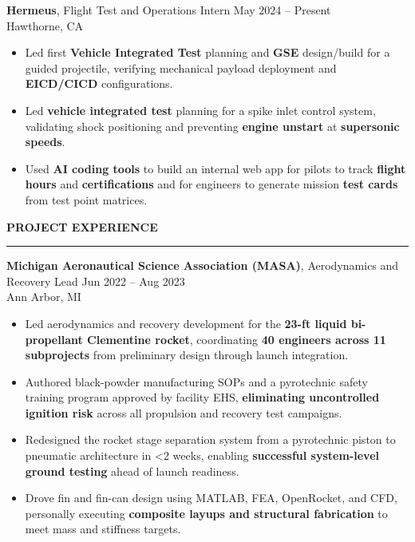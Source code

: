 \documentclass[10pt]{article}
\newcommand{\ressection}[1]{
  \vspace{0.12em}
  {\large\bfseries #1}\par
  \vspace{0.05em}\hrule\vspace{0.12em}
}
\begin{document}
{\bfseries Hermeus}, Flight Test and Operations Intern \hfill May 2024 -- Present \\
Hawthorne, CA
\begin{itemize}
\item Led first \textbf{Vehicle Integrated Test} planning and \textbf{GSE} design/build for a guided projectile, verifying mechanical payload deployment and \textbf{EICD/CICD} configurations.
\item Led \textbf{vehicle integrated test} planning for a spike inlet control system, validating shock positioning and preventing \textbf{engine unstart} at \textbf{supersonic speeds}.
\item Used \textbf{AI coding tools} to build an internal web app for pilots to track \textbf{flight hours} and \textbf{certifications} and for engineers to generate mission \textbf{test cards} from test point matrices.
\end{itemize}

\ressection{PROJECT EXPERIENCE}

{\bfseries Michigan Aeronautical Science Association (MASA)}, Aerodynamics and Recovery Lead \hfill Jun 2022 -- Aug 2023 \\
Ann Arbor, MI
\begin{itemize}
  \item Led aerodynamics and recovery development for the \textbf{23-ft liquid bi-propellant Clementine rocket}, coordinating \textbf{40 engineers across 11 subprojects} from preliminary design through launch integration.
  \item Authored black-powder manufacturing SOPs and a pyrotechnic safety training program approved by facility EHS, \textbf{eliminating uncontrolled ignition risk} across all propulsion and recovery test campaigns.
  \item Redesigned the rocket stage separation system from a pyrotechnic piston to pneumatic architecture in <2 weeks, enabling \textbf{successful system-level ground testing} ahead of launch readiness.
  \item Drove fin and fin-can design using MATLAB, FEA, OpenRocket, and CFD, personally executing \textbf{composite layups and structural fabrication} to meet mass and stiffness targets.
\end{itemize}
\end{document}

